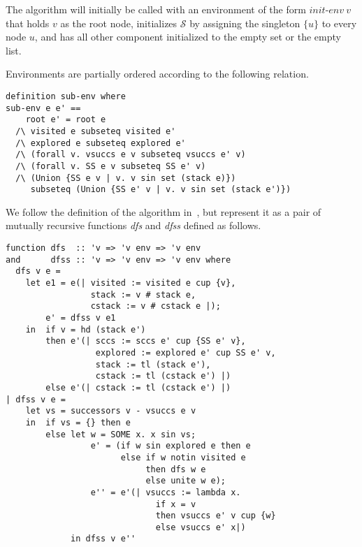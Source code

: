 \documentclass[sigplan,10pt,anonymous,review]{acmart}
\newcommand{\prog}[1]{\textit{#1}}
\renewcommand{\SS}{\mathcal{S}}
\begin{document}
The algorithm will initially be called with an environment of the form $\prog{init-env}~v$ that holds $v$ as the root node, initializes $\SS$ by assigning the singleton $\{u\}$ to every node $u$, and has all other component initialized to the empty set or the empty list.

Environments are partially ordered according to the following relation.

\begin{small}
\begin{lstlisting}[language=isabelle]
definition sub-env where
sub-env e e' ==
    root e' = root e
  /\ visited e subseteq visited e'
  /\ explored e subseteq explored e'
  /\ (forall v. vsuccs e v subseteq vsuccs e' v)
  /\ (forall v. SS e v subseteq SS e' v)
  /\ (Union {SS e v | v. v sin set (stack e)})
     subseteq (Union {SS e' v | v. v sin set (stack e')})
\end{lstlisting}
\end{small}

We follow the definition of the algorithm in~\cite{bloemen:strong}, but represent it as a pair of mutually recursive functions \prog{dfs} and \prog{dfss} defined as follows.

\begin{small}
\begin{lstlisting}[language=isabelle]
function dfs  :: 'v => 'v env => 'v env
and      dfss :: 'v => 'v env => 'v env where
  dfs v e =
    let e1 = e(| visited := visited e cup {v},
                 stack := v # stack e,
                 cstack := v # cstack e |);
        e' = dfss v e1
    in  if v = hd (stack e')
        then e'(| sccs := sccs e' cup {SS e' v},
                  explored := explored e' cup SS e' v,
                  stack := tl (stack e'),
                  cstack := tl (cstack e') |)
        else e'(| cstack := tl (cstack e') |)
| dfss v e =
    let vs = successors v - vsuccs e v
    in  if vs = {} then e
        else let w = SOME x. x sin vs;
                 e' = (if w sin explored e then e
                       else if w notin visited e
                            then dfs w e
                            else unite w e);
                 e'' = e'(| vsuccs := lambda x. 
                              if x = v 
                              then vsuccs e' v cup {w}
                              else vsuccs e' x|)
             in dfss v e''
\end{lstlisting}
\end{small}
\end{document}
